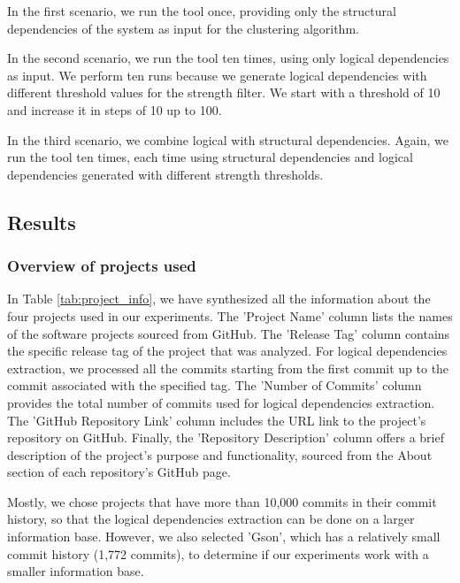 \documentclass{ieeeaccess}
\begin{document}
In the first scenario, we run the tool once, providing only the structural dependencies of the system as input for the clustering algorithm.

In the second scenario, we run the tool ten times, using only logical dependencies as input. We perform ten runs because we generate logical dependencies with different threshold values for the strength filter. We start with a threshold of 10 and increase it in steps of 10 up to 100.

In the third scenario, we combine logical with structural dependencies. Again, we run the tool ten times, each time using structural dependencies and logical dependencies generated with different strength thresholds.




\subsection{Results}
\label{subsec:results}

\subsubsection{Overview of projects used}




In Table \ref{tab:project_info}, we have synthesized all the information about the four projects used in our experiments. The 'Project Name' column lists the names of the software projects sourced from GitHub. The 'Release Tag' column contains the specific release tag of the project that was analyzed. For logical dependencies extraction, we processed all the commits starting from the first commit up to the commit associated with the specified tag. The 'Number of Commits' column provides the total number of commits used for logical dependencies extraction. The 'GitHub Repository Link' column includes the URL link to the project's repository on GitHub. Finally, the 'Repository Description' column offers a brief description of the project's purpose and functionality, sourced from the About section of each repository's GitHub page.


Mostly, we chose projects that have more than 10,000 commits in their commit history, so that the logical dependencies extraction can be done on a larger information base. However, we also selected 'Gson', which has a relatively small commit history (1,772 commits), to determine if our experiments work with a smaller information base.
\end{document}
